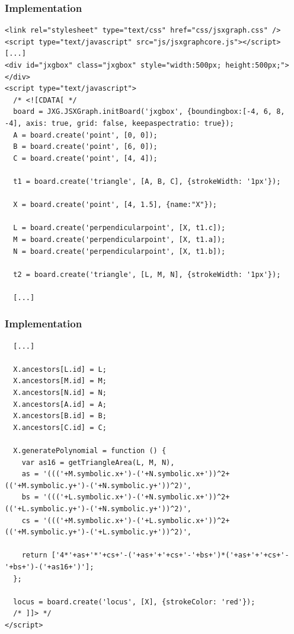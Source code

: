\documentclass{beamer}
\begin{document}
\begin{frame}[fragile]
  \frametitle{Implementation}

  \begin{block}{}
    \begin{lstlisting}
<link rel="stylesheet" type="text/css" href="css/jsxgraph.css" />
<script type="text/javascript" src="js/jsxgraphcore.js"></script>
[...]
<div id="jxgbox" class="jxgbox" style="width:500px; height:500px;"></div>
<script type="text/javascript">
  /* <![CDATA[ */
  board = JXG.JSXGraph.initBoard('jxgbox', {boundingbox:[-4, 6, 8, -4], axis: true, grid: false, keepaspectratio: true});
  A = board.create('point', [0, 0]);
  B = board.create('point', [6, 0]);
  C = board.create('point', [4, 4]);

  t1 = board.create('triangle', [A, B, C], {strokeWidth: '1px'});

  X = board.create('point', [4, 1.5], {name:"X"});

  L = board.create('perpendicularpoint', [X, t1.c]);
  M = board.create('perpendicularpoint', [X, t1.a]);
  N = board.create('perpendicularpoint', [X, t1.b]);

  t2 = board.create('triangle', [L, M, N], {strokeWidth: '1px'});

  [...]
    \end{lstlisting}
  \end{block}
\end{frame}


\begin{frame}[fragile]
  \frametitle{Implementation}

  \begin{block}{}
    \begin{lstlisting}
  [...]

  X.ancestors[L.id] = L;
  X.ancestors[M.id] = M;
  X.ancestors[N.id] = N;
  X.ancestors[A.id] = A;
  X.ancestors[B.id] = B;
  X.ancestors[C.id] = C;

  X.generatePolynomial = function () {
    var as16 = getTriangleArea(L, M, N),
    as = '((('+M.symbolic.x+')-('+N.symbolic.x+'))^2+(('+M.symbolic.y+')-('+N.symbolic.y+'))^2)',
    bs = '((('+L.symbolic.x+')-('+N.symbolic.x+'))^2+(('+L.symbolic.y+')-('+N.symbolic.y+'))^2)',
    cs = '((('+M.symbolic.x+')-('+L.symbolic.x+'))^2+(('+M.symbolic.y+')-('+L.symbolic.y+'))^2)',

    return ['4*'+as+'*'+cs+'-('+as+'+'+cs+'-'+bs+')*('+as+'+'+cs+'-'+bs+')-('+as16+')'];
  };

  locus = board.create('locus', [X], {strokeColor: 'red'});
  /* ]]> */
</script>
    \end{lstlisting}
  \end{block}
\end{frame}
\end{document}
